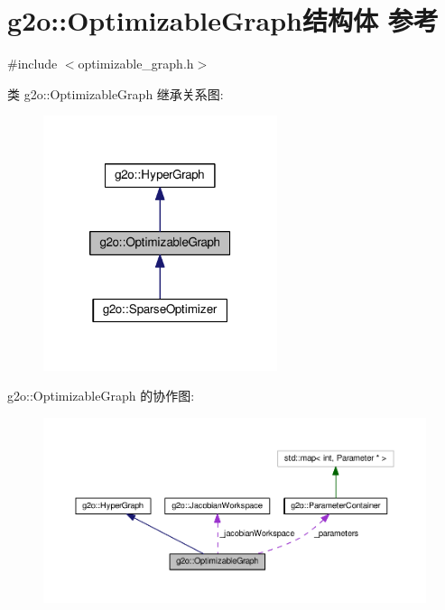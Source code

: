 \hypertarget{structg2o_1_1OptimizableGraph}{\section{g2o\-:\-:Optimizable\-Graph结构体 参考}
\label{structg2o_1_1OptimizableGraph}
}


{\ttfamily \#include $<$optimizable\-\_\-graph.\-h$>$}



类 g2o\-:\-:Optimizable\-Graph 继承关系图\-:
\nopagebreak
\begin{figure}[H]
\begin{center}
\leavevmode
\includegraphics[width=194pt]{structg2o_1_1OptimizableGraph__inherit__graph}
\end{center}
\end{figure}


g2o\-:\-:Optimizable\-Graph 的协作图\-:
\nopagebreak
\begin{figure}[H]
\begin{center}
\leavevmode
\includegraphics[width=350pt]{structg2o_1_1OptimizableGraph__coll__graph}
\end{center}
\end{figure}
